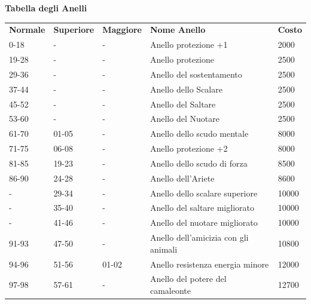 \documentclass[a4paper,11pt,twoside,openany]{book}
\begin{document}
\textbf{Tabella degli Anelli}

\medskip

\begin{tabular}{L{2cm} L{2cm} L{2cm} L{8cm} L{2cm}}
	\toprule
	\textbf{Normale} & \textbf{Superiore} & \textbf{Maggiore} & \textbf{Nome Anello}    & \textbf{Costo}\\
	0-18             & -  & - & Anello protezione +1           & 2000\\
	19-28            & -  & - & Anello protezione              & 2500\\
	29-36            & -  & - & Anello del sostentamento& 2500\\
	37-44            & -  & - & Anello dello Scalare        & 2500\\
	45-52            & -  & - & Anello del Saltare            & 2500\\
	53-60            & -  & - & Anello del Nuotare            & 2500\\
	61-70            & 01-05              & - & Anello dello scudo mentale            & 8000\\
	71-75            & 06-08              & - & Anello protezione +2    & 8000\\
	81-85            & 19-23              & - & Anello dello scudo di forza          & 8500\\
	86-90            & 24-28              & - & Anello dell'Ariete      & 8600\\
	-& 29-34              & - & Anello dello scalare superiore          & 10000\\
	-& 35-40              & - & Anello del saltare migliorato           & 10000\\
	-& 41-46              & - & Anello del nuotare migliorato           & 10000\\
	91-93            & 47-50              & - & Anello dell'amicizia con gli animali        & 10800\\
	94-96            & 51-56              & 01-02             & Anello resistenza energia minore       & 12000\\
	97-98            & 57-61              & - & Anello del potere del camaleonte                & 12700\\

\end{tabular}
\end{document}
